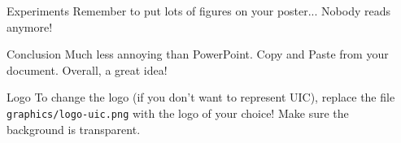 \documentclass{beamer}
\begin{document}
\begin{frame}{}
\begin{columns}[t]
\begin{column}{0.32\linewidth}
\end{column}%

\begin{column}{0.32\linewidth}

\begin{block}{Experiments}
Remember to put lots of figures on your poster... Nobody reads anymore!
\end{block}

\begin{block}{Conclusion}
Much less annoying than PowerPoint. Copy and Paste from your document. Overall, a great idea!
\end{block}

\begin{block}{Logo}
To change the logo (if you don't want to represent UIC), replace the file {\tt graphics/logo-uic.png} with the logo of your choice!
Make sure the background is transparent.
\end{block}

\end{column}%

\end{columns}
\end{frame}
\end{document}
